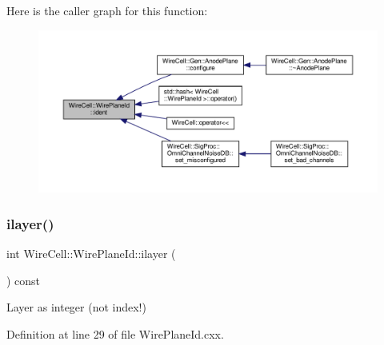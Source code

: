 Here is the caller graph for this function\+:
\nopagebreak
\begin{figure}[H]
\begin{center}
\leavevmode
\includegraphics[width=350pt]{class_wire_cell_1_1_wire_plane_id_adff770cfb3d3ddfa42ff55dbbb5cf0b9_icgraph}
\end{center}
\end{figure}
\mbox{\label{class_wire_cell_1_1_wire_plane_id_a33a565cfc76f84e9bc103b1ca33d0974}} 
\subsubsection{\texorpdfstring{ilayer()}{ilayer()}}
{\footnotesize\ttfamily int Wire\+Cell\+::\+Wire\+Plane\+Id\+::ilayer (\begin{DoxyParamCaption}{ }\end{DoxyParamCaption}) const}



Layer as integer (not index!) 



Definition at line 29 of file Wire\+Plane\+Id.\+cxx.

